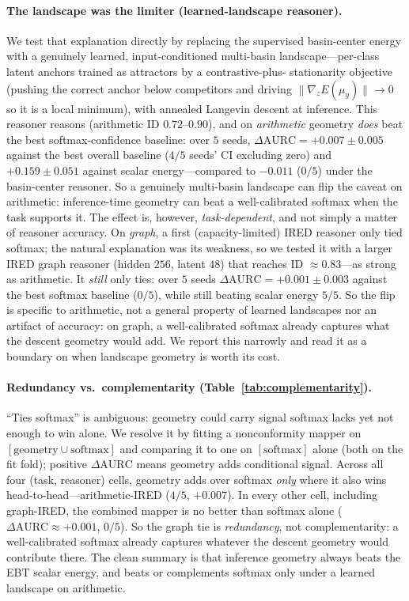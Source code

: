 \paragraph{The landscape was the limiter (learned-landscape reasoner).} We test that explanation
directly by replacing the supervised basin-center energy with a genuinely learned, input-conditioned
multi-basin landscape---per-class latent anchors trained as attractors by a contrastive-plus-%
stationarity objective (pushing the correct anchor below competitors and driving
$\|\nabla_z E(\mu_y)\|\!\to\!0$ so it is a local minimum), with annealed Langevin descent at
inference. This reasoner reasons (arithmetic ID $0.72$--$0.90$), and on \emph{arithmetic} geometry \emph{does}
beat the best softmax-confidence baseline: over $5$ seeds, $\Delta\mathrm{AURC} = +0.007\pm0.005$
against the best overall baseline ($4/5$ seeds' CI excluding zero) and $+0.159\pm0.051$ against
scalar energy---compared to $-0.011$ ($0/5$) under the basin-center reasoner. So a genuinely
multi-basin landscape can flip the caveat on arithmetic: inference-time geometry can beat a
well-calibrated softmax when the task supports it. The effect is, however, \emph{task-dependent}, and
not simply a matter of reasoner accuracy. On \emph{graph}, a first (capacity-limited) IRED reasoner
only tied softmax; the natural explanation was its weakness, so we tested it with a larger IRED graph
reasoner (hidden $256$, latent $48$) that reaches ID $\approx0.83$---as strong as arithmetic. It
\emph{still} only ties: over $5$ seeds $\Delta\mathrm{AURC}=+0.001\pm0.003$ against the best softmax
baseline ($0/5$), while still beating scalar energy $5/5$. So the flip is specific to arithmetic, not
a general property of learned landscapes nor an artifact of accuracy: on graph, a well-calibrated
softmax already captures what the descent geometry would add. We report this narrowly and read it as
a boundary on when landscape geometry is worth its cost.

\paragraph{Redundancy vs.\ complementarity (Table~\ref{tab:complementarity}).} ``Ties softmax'' is
ambiguous: geometry could carry signal softmax lacks yet not enough to win alone. We resolve it by
fitting a nonconformity mapper on $[\text{geometry}\cup\text{softmax}]$ and comparing it to one on
$[\text{softmax}]$ alone (both on the fit fold); positive $\Delta\mathrm{AURC}$ means geometry adds
conditional signal. Across all four (task, reasoner) cells, geometry adds over softmax \emph{only}
where it also wins head-to-head---arithmetic-IRED ($4/5$, $+0.007$). In every other cell, including
graph-IRED, the combined mapper is no better than softmax alone ($\Delta\mathrm{AURC}\approx+0.001$,
$0/5$). So the graph tie is \emph{redundancy}, not complementarity: a well-calibrated softmax already
captures whatever the descent geometry would contribute there. The clean summary is that inference
geometry always beats the EBT scalar energy, and beats or complements softmax only under a learned
landscape on arithmetic.

